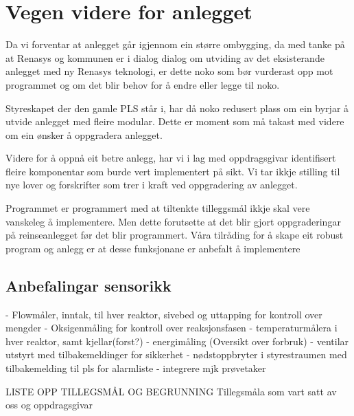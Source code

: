 \section{Vegen videre for anlegget}
\thispagestyle{fancy}

%

Da vi forventar at anlegget går igjennom ein større ombygging, da med tanke på at Renasys og kommunen er i dialog dialog om utviding 
av det eksisterande anlegget med ny Renasys teknologi, er dette noko som bør vurderast opp mot programmet 
og om det blir behov for å endre eller legge til noko. 

Styreskapet der den gamle PLS står i, har då noko redusert plass om ein byrjar å utvide anlegget med fleire modular. 
Dette er moment som må takast med videre om ein ønsker å oppgradera anlegget.

Videre for å oppnå eit betre anlegg, har vi i lag med oppdragsgivar identifisert fleire komponentar som burde 
vert implementert på sikt. Vi tar ikkje stilling til nye lover og forskrifter som trer i kraft ved oppgradering av anlegget.

Programmet er programmert med at tiltenkte tilleggsmål ikkje skal vere vanskeleg å implementere. 
Men dette forutsette at det blir gjort oppgraderingar på reinseanlegget før det blir programmert. 
Våra tilråding for å skape eit robust program og anlegg er at desse funksjonane er anbefalt å implementere

\subsection{Anbefalingar sensorikk}

- Flowmåler, inntak, til hver reaktor, sivebed og uttapping for kontroll over mengder
- Oksigenmåling for kontroll over reaksjonsfasen
- temperaturmålera i hver reaktor, samt kjellar(forst?)
- energimåling (Oversikt over forbruk)
- ventilar utstyrt med tilbakemeldinger for sikkerhet
- nødstoppbryter i styrestraumen med tilbakemelding til pls for alarmliste
- integrere mjk prøvetaker


LISTE OPP TILLEGSMÅL OG BEGRUNNING
Tillegsmåla som vart satt av oss og oppdragsgivar



\newpage


